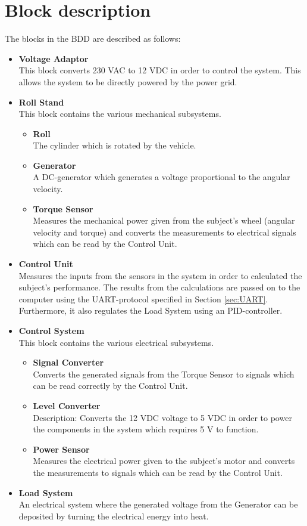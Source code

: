 \newpage
\section{Block description}
The blocks in the BDD are described as follows:
\begin{itemize}
	\item \textbf{Voltage Adaptor}\\
	This block converts 230 VAC to 12 VDC in order to control the system. This allows the system to be directly powered by the power grid.
	\item \textbf{Roll Stand}\\
	This block contains the various mechanical subsystems.
	\begin{itemize}
		\item \textbf{Roll}\\
		The cylinder which is rotated by the vehicle.
		\item \textbf{Generator}\\
		A DC-generator which generates a voltage proportional to the angular velocity.
		\item \textbf{Torque Sensor}\\
		Measures the mechanical power given from the subject's wheel (angular velocity and torque) and converts the measurements to electrical signals which can be read by the Control Unit.
	\end{itemize}
	\item \textbf{Control Unit}\\
	Measures the inputs from the sensors in the system in order to calculated the subject's performance. The results from the calculations are passed on to the computer using the UART-protocol specified in Section \vref{sec:UART}. Furthermore, it also regulates the Load System using an PID-controller.
	\item \textbf{Control System}\\
	This block contains the various electrical subsystems.
	\begin{itemize}
		\item \textbf{Signal Converter}\\
		Converts the generated signals from the Torque Sensor to signals which can be read correctly by the Control Unit.
		\item \textbf{Level Converter}\\
		Description: Converts the 12 VDC voltage to 5 VDC in order to power the components in the system which requires 5 V to function.
		\item \textbf{Power Sensor}\\
		Measures the electrical power given to the subject's motor and converts the measurements to signals which can be read by the Control Unit.
	\end{itemize}
	\item \textbf{Load System}\\
	An electrical system where the generated voltage from the Generator can be deposited by turning the electrical energy into heat.
\end{itemize}